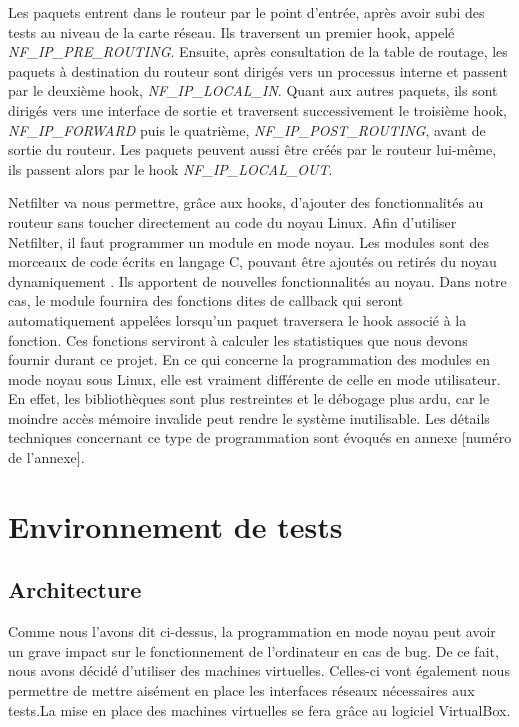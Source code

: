 \documentclass[a4paper]{article}
\begin{document}
Les paquets entrent dans le routeur par le point d'entrée, après avoir 
subi des tests au niveau de la carte réseau. Ils traversent un premier 
hook, appelé \textit{NF\_IP\_PRE\_ROUTING}. Ensuite, après consultation de la table 
de routage, les paquets à destination du routeur sont dirigés vers un 
processus interne et passent par le deuxième hook, \textit{NF\_IP\_LOCAL\_IN}. 
Quant aux autres paquets, ils sont dirigés vers une interface de sortie 
et traversent successivement le troisième hook, \textit{NF\_IP\_FORWARD} puis le 
quatrième, \textit{NF\_IP\_POST\_ROUTING}, avant de sortie du routeur. Les paquets 
peuvent aussi être créés par le routeur lui-même, ils passent alors 
par le hook \textit{NF\_IP\_LOCAL\_OUT}.

Netfilter va nous permettre, grâce aux hooks, d'ajouter des fonctionnalités au routeur 
sans toucher directement au code du noyau Linux. Afin d'utiliser Netfilter, il faut 
programmer un module en mode noyau. Les modules sont des morceaux de code écrits en 
langage C, pouvant être ajoutés ou retirés du noyau dynamiquement \cite{module1}. Ils apportent de 
nouvelles fonctionnalités au noyau. Dans notre cas, le module fournira des fonctions 
dites de callback qui seront automatiquement appelées lorsqu'un paquet traversera le 
hook associé à la fonction. Ces fonctions serviront à calculer les statistiques que 
nous devons fournir durant ce projet.
En ce qui concerne la programmation des modules en mode noyau sous Linux, elle est 
vraiment différente de celle en mode utilisateur. En effet, les bibliothèques sont 
plus restreintes et le débogage plus ardu, car le moindre accès mémoire invalide peut 
rendre le système inutilisable. Les détails techniques concernant ce type de programmation 
sont évoqués en annexe [numéro de l'annexe].

\section{Environnement de tests}

\subsection{Architecture}

Comme nous l'avons dit ci-dessus, la programmation en mode noyau peut avoir un grave 
impact sur le fonctionnement de l'ordinateur en cas de bug. De ce fait, nous avons 
décidé d'utiliser des machines virtuelles. Celles-ci vont également nous permettre 
de mettre aisément en place les interfaces réseaux nécessaires aux tests.La mise en 
place des machines virtuelles se fera grâce au logiciel VirtualBox.
\end{document}
